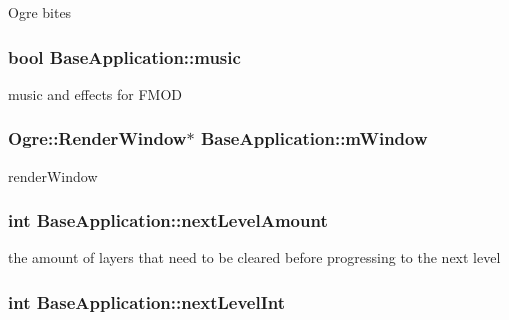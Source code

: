Ogre bites \hypertarget{class_base_application_a3cd36d39f168b56476c22d27cf9cb429}{
\subsubsection[{music}]{\setlength{\rightskip}{0pt plus 5cm}bool Base\-Application\-::music\hspace{0.3cm}{\ttfamily [protected]}}}\label{class_base_application_a3cd36d39f168b56476c22d27cf9cb429}
music and effects for F\-M\-O\-D \hypertarget{class_base_application_ac5d8e9c81e036897bc82f81eff8c570f}{
\subsubsection[{m\-Window}]{\setlength{\rightskip}{0pt plus 5cm}Ogre\-::\-Render\-Window$\ast$ Base\-Application\-::m\-Window\hspace{0.3cm}{\ttfamily [protected]}}}\label{class_base_application_ac5d8e9c81e036897bc82f81eff8c570f}
render\-Window \hypertarget{class_base_application_a48aa9aa0d39fac2805d912b9f4e8d593}{
\subsubsection[{next\-Level\-Amount}]{\setlength{\rightskip}{0pt plus 5cm}int Base\-Application\-::next\-Level\-Amount\hspace{0.3cm}{\ttfamily [protected]}}}\label{class_base_application_a48aa9aa0d39fac2805d912b9f4e8d593}
the amount of layers that need to be cleared before progressing to the next level \hypertarget{class_base_application_abaf901b9f1c0b913235a8d818ece8772}{
\subsubsection[{next\-Level\-Int}]{\setlength{\rightskip}{0pt plus 5cm}int Base\-Application\-::next\-Level\-Int\hspace{0.3cm}{\ttfamily [protected]}}}\label{class_base_application_abaf901b9f1c0b913235a8d818ece8772}
